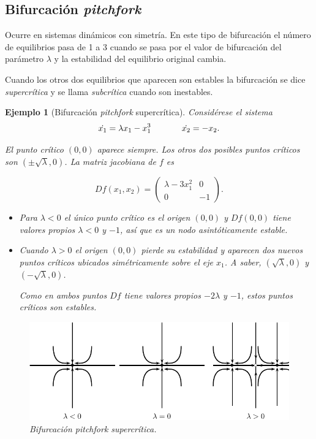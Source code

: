 \documentclass[11pt]{book}
\theoremstyle{definition}
\numberwithin{definition}{section}
\theoremstyle{theorem}
\numberwithin{theorem}{section}
\numberwithin{lemma}{section}
\numberwithin{corollary}{section}
\theoremstyle{plain}
\newtheorem{example}{Ejemplo}
\numberwithin{example}{section}
\begin{document}
\subsection{Bifurcación \textit{pitchfork}}

Ocurre en sistemas dinámicos con simetría. En este tipo de bifurcación el número de equilibrios pasa de 1 a 3 cuando se pasa por el valor de bifurcación del parámetro $\lambda$ y la estabilidad del equilibrio original cambia.

Cuando los otros dos equilibrios que aparecen son estables la bifurcación se dice \emph{supercrítica} y se llama \emph{subcrítica} cuando son inestables.

\begin{example}[Bifurcación \textit{pitchfork} supercrítica]
Considérese el sistema
$$ 
	\dot{x_1} = \lambda x_1 - x_1^3 \hspace{0.5in} \dot{x_2} = -x_2.
$$

El punto crítico $(0,0)$ aparece siempre. Los otros dos posibles puntos críticos son $(\pm \sqrt{\lambda}, 0)$.
La matriz jacobiana de $f$ es

$$
	Df(x_1,x_2) = \left( \begin{array}{ll}
		\lambda - 3x_1^2 & 0 \\
		0 & -1
	\end{array} \right).
$$

\begin{itemize}
	\item Para $\lambda < 0$ el único punto crítico es el origen $(0,0)$ y $Df(0,0)$ tiene valores propios $\lambda < 0$ y $-1$, así que es un nodo asintóticamente estable.
	\item Cuando $\lambda > 0$ el origen $(0,0)$ pierde su estabilidad y aparecen dos nuevos puntos críticos ubicados simétricamente sobre el eje $x_1$. A saber, $(\sqrt{\lambda}, 0)$ y $(-\sqrt{\lambda}, 0)$. 

Como en ambos puntos $Df$ tiene valores propios $-2\lambda$ y $-1$, estos puntos críticos son estables.
\end{itemize}

\begin{figure}[ht] \centering
    \includegraphics[scale=1.0]{figures/bifurcations-pitchforksupercritical.pdf} 
    \caption{Bifurcación \textit{pitchfork} supercrítica.}
\end{figure}

\end{example}
\end{document}
